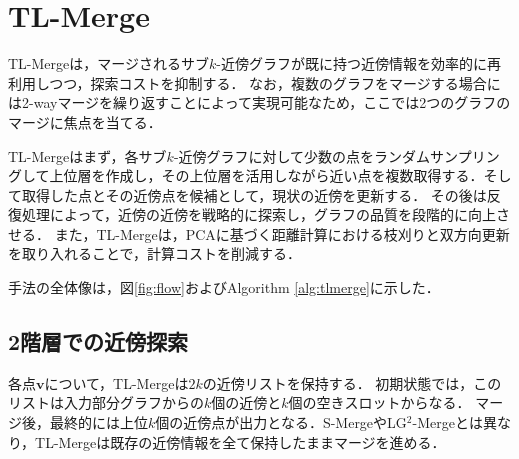 \documentclass[submit,techrep,noauthor]{ipsj}
\newcommand{\vb}[1]{\boldsymbol{#1}}
\begin{document}
\section{TL-Merge}
\label{sec:proposed}
TL-Mergeは，マージされるサブ$k$-近傍グラフが既に持つ近傍情報を効率的に再利用しつつ，探索コストを抑制する．
なお，複数のグラフをマージする場合には2-wayマージを繰り返すことによって実現可能なため，ここでは2つのグラフのマージに焦点を当てる．

TL-Mergeはまず，各サブ$k$-近傍グラフに対して少数の点をランダムサンプリングして上位層を作成し，その上位層を活用しながら近い点を複数取得する．そして取得した点とその近傍点を候補として，現状の近傍を更新する．
その後は反復処理によって，近傍の近傍を戦略的に探索し，グラフの品質を段階的に向上させる．
また，TL-Mergeは，PCAに基づく距離計算における枝刈りと双方向更新を取り入れることで，計算コストを削減する．


手法の全体像は，図\ref{fig:flow}およびAlgorithm \ref{alg:tlmerge}に示した．

\subsection{2階層での近傍探索}
\label{subsec:search}
各点$\vb{v}$について，TL-Mergeは$2k$の近傍リストを保持する．
初期状態では，このリストは入力部分グラフからの$k$個の近傍と$k$個の空きスロットからなる．
マージ後，最終的には上位$k$個の近傍点が出力となる．S-MergeやLG$^2$-Mergeとは異なり，TL-Mergeは既存の近傍情報を全て保持したままマージを進める．
\end{document}
